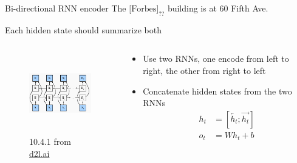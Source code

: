 \documentclass[usenames,dvipsnames,notes,11pt,aspectratio=169,hyperref={colorlinks=true, linkcolor=blue}]{beamer}
\begin{document}
\begin{frame}
    {Bi-directional RNN encoder}
    The $\text{[Forbes]}_{??}$ building is at 60 Fifth Ave.
    \pause

    Each hidden state should summarize both 
    \pause

    \medskip
    \begin{columns}
        \begin{column}{0.5\textwidth}
    \begin{figure}
        \includegraphics[height=3.5cm]{figures/birnn}
        \caption{10.4.1 from \href{https://d2l.ai/chapter_recurrent-modern/bi-rnn.html}{d2l.ai}}
    \end{figure}
        \end{column}
        \begin{column}{0.5\textwidth}
            \begin{itemize}
                \item Use two RNNs, one encode from left to right, the other from right to left
                \item Concatenate hidden states from the two RNNs
            \begin{align*}
                h_t &= [\overleftarrow{h_t}; \overrightarrow{h_t}]\\
                o_t &= Wh_t + b
            \end{align*}
            \end{itemize}
        \end{column}
    \end{columns}
\end{frame}
\end{document}
